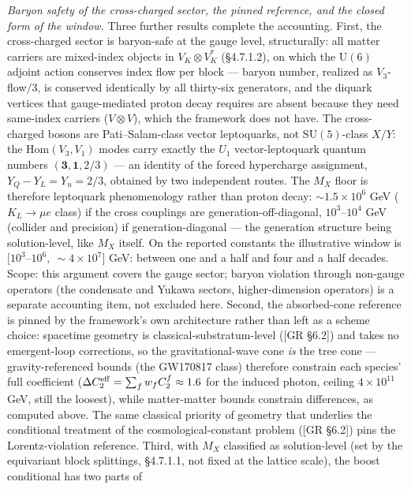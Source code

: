 \documentclass[
]{article}
\begin{document}
\emph{Baryon safety of the cross-charged sector, the pinned reference,
and the closed form of the window.} Three further results complete the
accounting. First, the cross-charged sector is baryon-safe at the gauge
level, structurally: all matter carriers are mixed-index objects in
\(V_K \otimes V_K^*\) (§4.7.1.2), on which the \(\mathrm{U}(6)\) adjoint
action conserves index flow per block --- baryon number, realized as
\(V_3\)-flow\(/3\), is conserved identically by all thirty-six
generators, and the diquark vertices that gauge-mediated proton decay
requires are absent because they need same-index carriers
(\(V \otimes V\)), which the framework does not have. The cross-charged
bosons are Pati--Salam-class vector leptoquarks, not
\(\mathrm{SU}(5)\)-class \(X/Y\): the \(\mathrm{Hom}(V_3, V_1)\) modes
carry exactly the \(U_1\) vector-leptoquark quantum numbers
\((\mathbf{3}, \mathbf{1}, 2/3)\) --- an identity of the forced
hypercharge assignment, \(Y_Q - Y_L = Y_u = 2/3\), obtained by two
independent routes. The \(M_X\) floor is therefore leptoquark
phenomenology rather than proton decay: \(\sim 1.5 \times 10^{6}\) GeV
(\(K_L \to \mu e\) class) if the cross couplings are
generation-off-diagonal, \(10^{3}\)--\(10^{4}\) GeV (collider and
precision) if generation-diagonal --- the generation structure being
solution-level, like \(M_X\) itself. On the reported constants the
illustrative window is \([10^{3}\)--\(10^{6},\ \sim 4 \times 10^{7}]\)
GeV: between one and a half and four and a half decades. Scope: this
argument covers the gauge sector; baryon violation through non-gauge
operators (the condensate and Yukawa sectors, higher-dimension
operators) is a separate accounting item, not excluded here. Second, the
absorbed-cone reference is pinned by the framework's own architecture
rather than left as a scheme choice: spacetime geometry is
classical-substratum-level ({[}GR §6.2{]}) and takes no emergent-loop
corrections, so the gravitational-wave cone \emph{is} the tree cone ---
gravity-referenced bounds (the GW170817 class) therefore constrain each
species' full coefficient
(\(\Delta C_2^{\rm eff} = \sum_f w_f C_2^f \approx 1.6\) for the induced
photon, ceiling \(4 \times 10^{11}\) GeV, still the loosest), while
matter-matter bounds constrain differences, as computed above. The same
classical priority of geometry that underlies the conditional treatment
of the cosmological-constant problem ({[}GR §6.2{]}) pins the
Lorentz-violation reference. Third, with \(M_X\) classified as
solution-level (set by the equivariant block splittings, §4.7.1.1, not
fixed at the lattice scale), the boost conditional has two parts of
\end{document}
